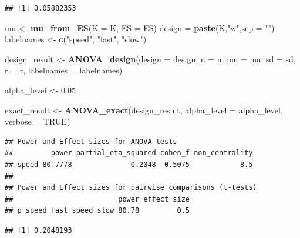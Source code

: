 \documentclass[
]{book}
\newenvironment{Shaded}{\begin{snugshade}}{\end{snugshade}}
\newcommand{\DataTypeTok}[1]{\textcolor[rgb]{0.13,0.29,0.53}{#1}}
\newcommand{\FloatTok}[1]{\textcolor[rgb]{0.00,0.00,0.81}{#1}}
\newcommand{\KeywordTok}[1]{\textcolor[rgb]{0.13,0.29,0.53}{\textbf{#1}}}
\newcommand{\NormalTok}[1]{#1}
\newcommand{\OperatorTok}[1]{\textcolor[rgb]{0.81,0.36,0.00}{\textbf{#1}}}
\newcommand{\OtherTok}[1]{\textcolor[rgb]{0.56,0.35,0.01}{#1}}
\newcommand{\StringTok}[1]{\textcolor[rgb]{0.31,0.60,0.02}{#1}}
\begin{document}
\begin{verbatim}
## [1] 0.05882353
\end{verbatim}

\begin{Shaded}
\begin{Highlighting}[]
\NormalTok{mu <-}\StringTok{ }\KeywordTok{mu_from_ES}\NormalTok{(}\DataTypeTok{K =}\NormalTok{ K, }\DataTypeTok{ES =}\NormalTok{ ES)}
\NormalTok{design =}\StringTok{ }\KeywordTok{paste}\NormalTok{(K,}\StringTok{"w"}\NormalTok{,}\DataTypeTok{sep =} \StringTok{""}\NormalTok{)}
\NormalTok{labelnames <-}\StringTok{ }\KeywordTok{c}\NormalTok{(}\StringTok{"speed"}\NormalTok{, }\StringTok{"fast"}\NormalTok{, }\StringTok{"slow"}\NormalTok{)}

\NormalTok{design_result <-}\StringTok{ }\KeywordTok{ANOVA_design}\NormalTok{(}\DataTypeTok{design =}\NormalTok{ design,}
                   \DataTypeTok{n =}\NormalTok{ n, }
                   \DataTypeTok{mu =}\NormalTok{ mu, }
                   \DataTypeTok{sd =}\NormalTok{ sd, }
                   \DataTypeTok{r =}\NormalTok{ r, }
                   \DataTypeTok{labelnames =}\NormalTok{ labelnames)}

\NormalTok{alpha_level <-}\StringTok{ }\FloatTok{0.05}

\NormalTok{exact_result <-}\StringTok{ }\KeywordTok{ANOVA_exact}\NormalTok{(design_result,}
                            \DataTypeTok{alpha_level =}\NormalTok{ alpha_level,}
                            \DataTypeTok{verbose =} \OtherTok{TRUE}\NormalTok{)}
\end{Highlighting}
\end{Shaded}

\begin{verbatim}
## Power and Effect sizes for ANOVA tests
##         power partial_eta_squared cohen_f non_centrality
## speed 80.7778              0.2048  0.5075            8.5
## 
## Power and Effect sizes for pairwise comparisons (t-tests)
##                         power effect_size
## p_speed_fast_speed_slow 80.78         0.5
\end{verbatim}

\begin{Shaded}
\end{Shaded}

\begin{verbatim}
## [1] 0.2048193
\end{verbatim}
\end{document}
